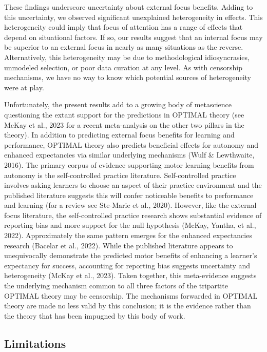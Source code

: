 \documentclass[
  11pt,
  doc, donotrepeattitle,floatsintext]{apa7}
\begin{document}
These findings underscore uncertainty about external focus benefits. Adding to this uncertainty, we observed significant unexplained heterogeneity in effects. This heterogeneity could imply that focus of attention has a range of effects that depend on situational factors. If so, our results suggest that an internal focus may be superior to an external focus in nearly as many situations as the reverse. Alternatively, this heterogeneity may be due to methodological idiosyncrasies, unmodeled selection, or poor data curation at any level. As with censorship mechanisms, we have no way to know which potential sources of heterogeneity were at play.

Unfortunately, the present results add to a growing body of metascience questioning the extant support for the predictions in OPTIMAL theory (see McKay et al., 2023 for a recent meta-analysis on the other two pillars in the theory). In addition to predicting external focus benefits for learning and performance, OPTIMAL theory also predicts beneficial effects for autonomy and enhanced expectancies via similar underlying mechanisms (Wulf \& Lewthwaite, 2016). The primary corpus of evidence supporting motor learning benefits from autonomy is the self-controlled practice literature. Self-controlled practice involves asking learners to choose an aspect of their practice environment and the published literature suggests this will confer noticeable benefits to performance and learning (for a review see Ste-Marie et al., 2020). However, like the external focus literature, the self-controlled practice research shows substantial evidence of reporting bias and more support for the null hypothesis (McKay, Yantha, et al., 2022). Approximately the same pattern emerges for the enhanced expectancies research (Bacelar et al., 2022). While the published literature appears to unequivocally demonstrate the predicted motor benefits of enhancing a learner's expectancy for success, accounting for reporting bias suggests uncertainty and heterogeneity (McKay et al., 2023). Taken together, this meta-evidence suggests the underlying mechanism common to all three factors of the tripartite OPTIMAL theory may be censorship. The mechanisms forwarded in OPTIMAL theory are made no less valid by this conclusion; it is the evidence rather than the theory that has been impugned by this body of work.

\hypertarget{limitations}{%
\subsection{Limitations}\label{limitations}}
\end{document}
